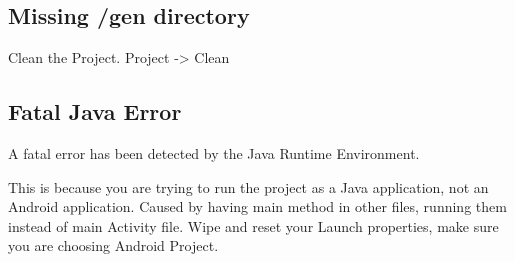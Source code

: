 \subsection{Missing /gen directory}

Clean the Project. Project -> Clean

\subsection{Fatal Java Error}

A fatal error has been detected by the Java Runtime Environment.

This is because you are trying to run the project as a Java application,
not an Android application. Caused by having main method in other files, 
running them instead of main Activity file. 
Wipe and reset your Launch properties,
make sure you are choosing Android Project.
